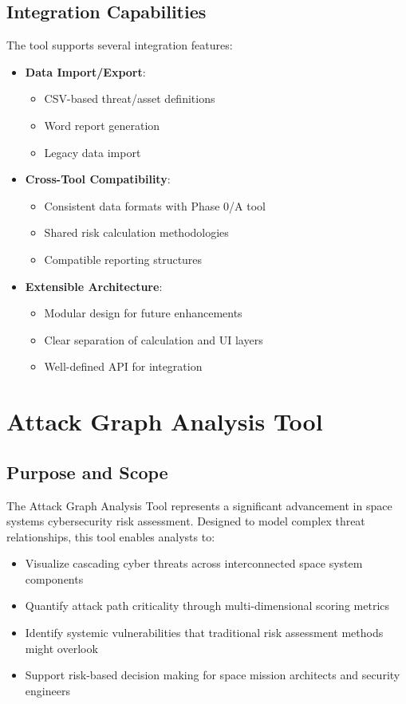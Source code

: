 \documentclass[binding=0.6cm]{sapthesis}
\begin{document}
\subsection{Integration Capabilities}

The tool supports several integration features:

\begin{itemize}
\item \textbf{Data Import/Export}:
\begin{itemize}
\item CSV-based threat/asset definitions
\item Word report generation
\item Legacy data import
\end{itemize}

\item \textbf{Cross-Tool Compatibility}:
\begin{itemize}
    \item Consistent data formats with Phase 0/A tool
    \item Shared risk calculation methodologies
    \item Compatible reporting structures
\end{itemize}

\item \textbf{Extensible Architecture}:
\begin{itemize}
    \item Modular design for future enhancements
    \item Clear separation of calculation and UI layers
    \item Well-defined API for integration
\end{itemize}
\end{itemize}




\section{Attack Graph Analysis Tool}
\subsection{Purpose and Scope}

The Attack Graph Analysis Tool represents a significant advancement in space systems cybersecurity risk assessment. Designed to model complex threat relationships, this tool enables analysts to:

\begin{itemize}
\item Visualize cascading cyber threats across interconnected space system components
\item Quantify attack path criticality through multi-dimensional scoring metrics
\item Identify systemic vulnerabilities that traditional risk assessment methods might overlook
\item Support risk-based decision making for space mission architects and security engineers
\end{itemize}
\end{document}
